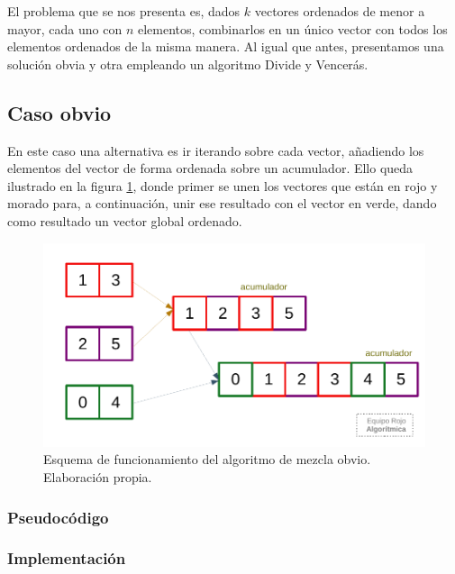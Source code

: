 El problema que se nos presenta es, dados $k$ vectores ordenados de menor a mayor,
cada uno con $n$ elementos, combinarlos en un único vector con todos los elementos
ordenados de la misma manera. Al igual que antes, presentamos una solución obvia y
otra empleando un algoritmo Divide y Vencerás. 

\subsection{Caso obvio}

En este caso una alternativa es ir iterando sobre cada vector, añadiendo los elementos
del vector de forma ordenada sobre un acumulador. Ello queda ilustrado en la figura
\ref{fig:2a-obvio}, donde primer se unen los vectores que están en rojo y morado para,
a continuación, unir ese resultado con el vector en verde, dando como resultado
un vector global ordenado. 

\begin{figure}
    \centering
    \includegraphics[scale=0.87]{img/orden_2a.pdf}
    \caption{Esquema de funcionamiento del algoritmo de 
    mezcla obvio. Elaboración propia.}
    \label{fig:2a-obvio}
\end{figure}

\subsubsection{Pseudocódigo}



\subsubsection{Implementación}

